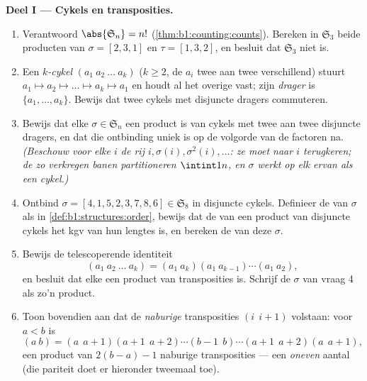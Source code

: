 \begin{problem}
\medskip
\noindent\textbf{Deel I --- Cykels en transposities.}
\begin{enumerate}
  \item Verantwoord $\abs{\mathfrak S_n} = n!$
        (\cref{thm:b1:counting:counts}). Bereken in $\mathfrak S_3$
        beide producten van $\sigma = [2, 3, 1]$ en $\tau = [1, 3, 2]$,
        en besluit dat $\mathfrak S_3$ niet  is.
  \item Een \emph{$k$-cykel} $(a_1\ a_2\ \dots\ a_k)$ ($k \geq 2$, de
        $a_i$ twee aan twee verschillend) stuurt $a_1 \mapsto a_2
        \mapsto \dots \mapsto a_k \mapsto a_1$ en houdt al het overige
        vast; zijn \emph{drager} is $\{a_1, \dots, a_k\}$. Bewijs dat
        twee cykels met disjuncte dragers commuteren.
  \item Bewijs dat elke $\sigma \in \mathfrak S_n$ een product is van
        cykels met twee aan twee disjuncte dragers, en dat die
        ontbinding uniek is op de volgorde van de factoren na.
        \emph{(Beschouw voor elke $i$ de rij $i, \sigma(i),
        \sigma^2(i), \dots$: ze moet naar $i$ terugkeren; de zo
        verkregen \emph{banen} partitioneren $\intint1n$, en $\sigma$
        werkt op elk ervan als een cykel.)}
  \item Ontbind $\sigma = [4, 1, 5, 2, 3, 7, 8, 6] \in \mathfrak S_8$ in
        disjuncte cykels. Definieer de \emph{} van $\sigma$ als in
        \cref{def:b1:structures:order}, bewijs dat de  van een
        product van disjuncte cykels het kgv van hun lengtes is, en
        bereken de  van deze $\sigma$.
  \item Bewijs de telescoperende identiteit
        \[
        (a_1\ a_2\ \dots\ a_k)
        = (a_1\ a_k)(a_1\ a_{k-1})\cdots(a_1\ a_2) ,
        \]
        en besluit dat elke  een product van transposities is.
        Schrijf de $\sigma$ van vraag 4 als zo'n product.
  \item Toon bovendien aan dat de \emph{naburige} transposities $(i\ \
        i{+}1)$ volstaan: voor $a < b$ is
        \[
        (a\ b) = (a\ \ a{+}1)(a{+}1\ \ a{+}2)\cdots(b{-}1\ \ b)
        \cdots(a{+}1\ \ a{+}2)(a\ \ a{+}1),
        \]
        een product van $2(b - a) - 1$ naburige transposities --- een
        \emph{oneven} aantal (die pariteit doet er hieronder tweemaal
        toe).
\end{enumerate}


\end{problem}
